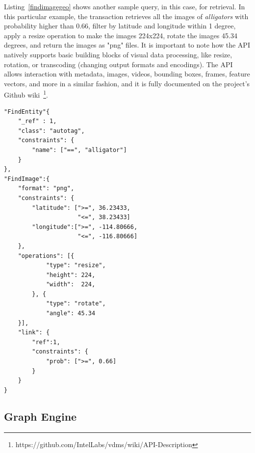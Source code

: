 Listing~\ref{findimagegeo} shows another sample query, in this case, for retrieval.
In this particular example, the transaction retrieves all the images
of \textit{alligators} with probability higher than 0.66,
filter by latitude and longitude within 1 degree,
apply a resize operation to make the images 224x224,
rotate the images 45.34 degrees, and return the images as "png" files.
It is important to note how the API natively supports basic building
blocks of visual data processing, like resize, rotation, or transcoding
(changing output formats and encodings).
The API allows interaction with metadata, images, videos, bounding boxes,
frames, feature vectors, and more in a similar fashion,
and it is fully documented on the project's Github
wiki~\footnote{https://github.com/IntelLabs/vdms/wiki/API-Description}.

\begin{listing}[ht!]
\begin{verbatim}
"FindEntity"{
    "_ref" : 1,
    "class": "autotag",
    "constraints": {
        "name": ["==", "alligator"]
    }
},
"FindImage":{
    "format": "png",
    "constraints": {
        "latitude": [">=", 36.23433,
                     "<=", 38.23433]
        "longitude":[">=", -114.80666,
                     "<=", -116.80666]
    },
    "operations": [{
            "type": "resize",
            "height": 224,
            "width":  224,
        }, {
            "type": "rotate",
            "angle": 45.34
    }],
    "link": {
        "ref":1,
        "constraints": {
            "prob": [">=", 0.66]
        }
    }
}

\end{verbatim}
\caption{Sample Query for Image Retrieval -
The query expresses the following:
Find all the images connected to the autotag \textit{alligator}
with probability higher than 0.66,
filter the images by latitude and longitude within 1 degree,
apply a resize operation to make the images 224x224,
rotate the image 45.34 degrees,
and return the images as "png" files.}
\label{findimagegeo}
\end{listing}

\subsection{Graph Engine}

